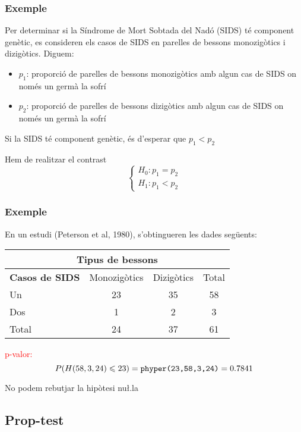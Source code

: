 \documentclass[12pt,t]{beamer}
\newcommand{\red}[1]{\textcolor{red}{#1}}
\renewcommand{\leq}{\leqslant}
\theoremstyle{plain}
\theoremstyle{definition}
\begin{document}
\begin{frame}
\frametitle{Exemple}
\vspace*{-1ex}

Per determinar si la Síndrome de Mort Sobtada del Nadó (SIDS) té component genètic, es consideren els casos de SIDS en parelles de bessons monozigòtics i dizigòtics. Diguem: 
\begin{itemize}
\item $p_1$: proporció de parelles de bessons monozigòtics amb algun cas de SIDS on només un germà la sofrí

\item $p_2$: proporció de parelles de bessons dizigòtics amb algun cas de SIDS on només un germà la sofrí
\end{itemize}

Si la SIDS té component genètic, és d'esperar que $p_1<p_2$
\medskip

Hem de realitzar el contrast
$$
\left\{\begin{array}{l}
H_0:p_1=p_2\\
H_1:p_1< p_2
\end{array}\right.
$$
\end{frame}

\begin{frame}
\frametitle{Exemple}

En un estudi (Peterson et al, 1980), s'obtingueren les dades següents:
\begin{center}
\begin{tabular}{l|cc|c|}
\multicolumn{4}{c}{\textbf{\hphantom{ \textbf{Casos de }} Tipus de bessons}} \\ \hline
 \textbf{Casos de SIDS} & Monozigòtics & Dizigòtics & Total \\
 Un  & 23 & 35 & 58\\
 Dos & 1 & 2 & 3\\\hline
Total  & 24 & 37 & 61
\\\hline
\end{tabular}
\end{center}

\red{p-valor:}
$$
P(H(58,3,24)\leq 23) =\mbox{\texttt{phyper(23,58,3,24)}}=0.7841
$$

No podem rebutjar la hipòtesi nu\l.la

\end{frame}





\subsection{Prop-test}
\end{document}
